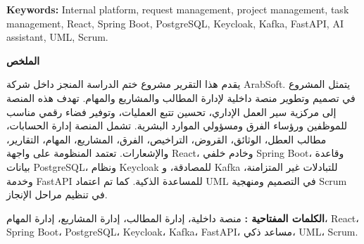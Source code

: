 \documentclass[a4paper,12pt]{article}
\newcommand{\textLR}[1]{\textenglish{#1}}
\begin{document}
{\textbf{Keywords:} Internal platform, request management, project management, task management, React, Spring Boot, PostgreSQL, Keycloak, Kafka, FastAPI, AI assistant, UML, Scrum.

\vspace{0.12cm}

\begin{Arabic}
\begin{flushright}
\textbf{الملخص}

يقدم هذا التقرير مشروع ختم الدراسة المنجز داخل شركة \textLR{ArabSoft}. يتمثل المشروع في تصميم وتطوير منصة داخلية لإدارة المطالب والمشاريع والمهام. تهدف هذه المنصة إلى مركزية سير العمل الإداري، تحسين تتبع العمليات، وتوفير فضاء رقمي مناسب للموظفين ورؤساء الفرق ومسؤولي الموارد البشرية. تشمل المنصة إدارة الحسابات، مطالب العطل، الوثائق، القروض، التراخيص، الفرق، المشاريع، المهام، التقارير، والإشعارات. تعتمد المنظومة على واجهة \textLR{React}، وخادم خلفي \textLR{Spring Boot}، وقاعدة بيانات \textLR{PostgreSQL}، ونظام \textLR{Keycloak} للمصادقة، و \textLR{Kafka} للتبادلات غير المتزامنة، وخدمة \textLR{FastAPI} للمساعدة الذكية. كما تم اعتماد \textLR{UML} في التصميم ومنهجية \textLR{Scrum} في تنظيم مراحل الإنجاز.

\textbf{الكلمات المفتاحية :} منصة داخلية، إدارة المطالب، إدارة المشاريع، إدارة المهام، \textLR{React}، \textLR{Spring Boot}، \textLR{PostgreSQL}، \textLR{Keycloak}، \textLR{Kafka}، \textLR{FastAPI}، مساعد ذكي، \textLR{UML}، \textLR{Scrum}.
\end{flushright}
\end{Arabic}

}
\end{document}
